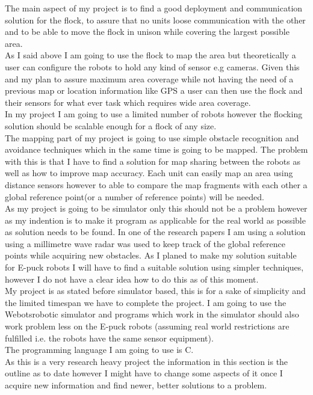 \documentclass[10pt,a4paper]{article}
\begin{document}
\begin{flushleft}
The main aspect of my project is to find a good deployment and communication solution for the flock, to assure that no units loose communication with the other and to be able to move the flock in unison while covering the largest possible area. \\
As I said above I am going to use the flock to map the area but theoretically a user can configure the robots to hold any kind of sensor e.g cameras. Given this and my plan to assure maximum area coverage while not having the need of a previous map or location information like GPS a user can then use the flock and their sensors for what ever task which requires wide area coverage.  \\
In my project I am going to use a limited number of robots however the flocking solution should be scalable enough for a flock of any size.\\[3ex]

The  mapping part of my project is going to use simple obstacle recognition and avoidance techniques which in the same time is going to be mapped. The problem with this is that I have to find a solution for map sharing between the robots as well as how to improve map accuracy. Each unit can easily map an area using distance sensors however to able to compare the map fragments with each other a global reference point(or a number of reference points) will be needed. \\
As my project is going to be simulator only this should not be a problem however as my indention is to make it program as applicable for the real world as possible as solution needs to be found. In one of the research papers I am using a solution using a millimetre wave radar was used to keep track of the global reference points while acquiring new obstacles\cite{citeulike:8530320}. As I planed to make my solution suitable for E-puck robots I will have to find a suitable solution using simpler techniques, however I do not have a clear idea how to do this as of this moment.\\[3ex]

My project is as stated before simulator based, this is for a sake of simplicity and the limited timespan we have to complete the project.  I am going to use the Webots\texttrademark robotic simulator and programs which work in the simulator should also work problem less on the E-puck robots (assuming real world restrictions are fulfilled i.e. the robots have the same sensor equipment). \\
The programming language I am going to use is C. \\
As this is a very research heavy project the information in this section is the outline as to date however I might have to change some aspects of it once I acquire new information and find newer, better solutions to a problem.
\newpage


\end{flushleft}
\end{document}
